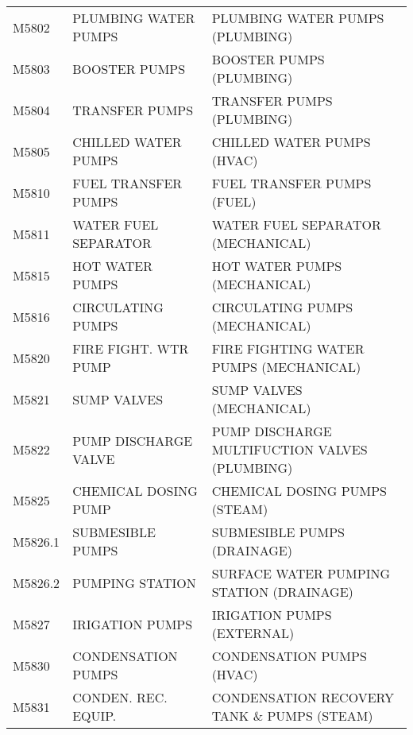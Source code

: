 \begin{longtable}[l]{l%
                  l|%
                  l|}
\rowcolor{thetableheadbgcolor!0.25!white} M5802       & PLUMBING WATER PUMPS   & PLUMBING WATER PUMPS (PLUMBING)   \\
\rowcolor{thetableheadbgcolor!0.25!white} M5803       & BOOSTER PUMPS   & BOOSTER PUMPS (PLUMBING)   \\
\rowcolor{thetableheadbgcolor!0.25!white} M5804       & TRANSFER PUMPS   & TRANSFER PUMPS (PLUMBING)   \\
\rowcolor{thetableheadbgcolor!0.25!white} M5805       & CHILLED WATER PUMPS   & CHILLED WATER PUMPS (HVAC)   \\
\rowcolor{thetableheadbgcolor!0.25!white} M5810       & FUEL TRANSFER PUMPS   & FUEL TRANSFER PUMPS (FUEL)   \\
\rowcolor{thetableheadbgcolor!0.25!white} M5811       & WATER FUEL SEPARATOR   & WATER FUEL SEPARATOR (MECHANICAL)   \\
\rowcolor{thetableheadbgcolor!0.25!white} M5815       & HOT WATER PUMPS   & HOT WATER PUMPS (MECHANICAL)   \\
\rowcolor{thetableheadbgcolor!0.25!white} M5816       & CIRCULATING PUMPS   & CIRCULATING PUMPS (MECHANICAL)   \\
\rowcolor{thetableheadbgcolor!0.25!white} M5820       & FIRE FIGHT. WTR PUMP   & FIRE FIGHTING WATER PUMPS (MECHANICAL)   \\
\rowcolor{thetableheadbgcolor!0.25!white} M5821       & SUMP VALVES   & SUMP VALVES (MECHANICAL)   \\
\rowcolor{thetableheadbgcolor!0.25!white} M5822       & PUMP DISCHARGE VALVE   & PUMP DISCHARGE MULTIFUCTION VALVES (PLUMBING)   \\
\rowcolor{thetableheadbgcolor!0.25!white} M5825       & CHEMICAL DOSING PUMP   & CHEMICAL DOSING PUMPS (STEAM)   \\
\rowcolor{thetableheadbgcolor!0.25!white} M5826.1     & SUBMESIBLE PUMPS   & SUBMESIBLE PUMPS (DRAINAGE)   \\
\rowcolor{thetableheadbgcolor!0.25!white} M5826.2     & PUMPING STATION   & SURFACE WATER PUMPING STATION (DRAINAGE)   \\
\rowcolor{thetableheadbgcolor!0.25!white} M5827       & IRIGATION PUMPS   & IRIGATION PUMPS (EXTERNAL)   \\
\rowcolor{thetableheadbgcolor!0.25!white} M5830       & CONDENSATION PUMPS   & CONDENSATION PUMPS (HVAC)   \\
\rowcolor{thetableheadbgcolor!0.25!white} M5831       & CONDEN. REC. EQUIP.   & CONDENSATION RECOVERY TANK \& PUMPS (STEAM)   \\

\end{longtable}
